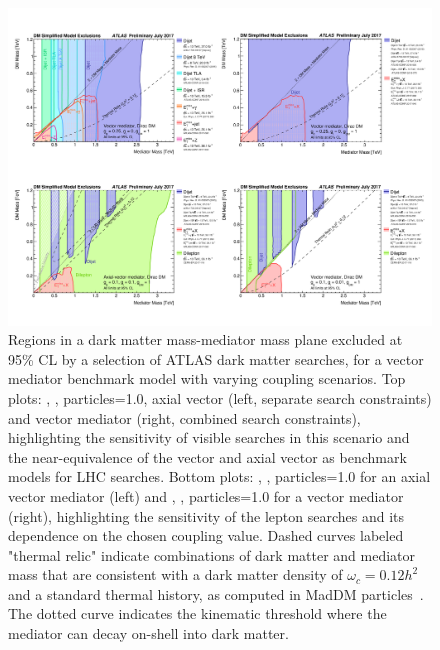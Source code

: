 \begin{figure}[!htpb]
\includegraphics[width=\textwidth]{figures/SummaryPlotsMassMass.pdf}\caption{
Regions in a dark matter mass-mediator mass plane excluded at 95\% CL by a selection of ATLAS dark matter searches, for a vector mediator benchmark model with varying coupling scenarios. Top plots: , , \ginvisible particles=1.0, axial vector (left, separate search constraints) and vector mediator (right, combined search constraints), highlighting the sensitivity of visible searches in this scenario and the near-equivalence of the vector and axial vector as benchmark models for LHC searches. Bottom plots: , , \ginvisible particles=1.0 for an axial vector mediator (left) and , , \ginvisible particles=1.0 for a vector mediator (right), highlighting the sensitivity of the lepton searches and its dependence on the chosen coupling value. Dashed curves labeled "thermal relic" indicate combinations of dark matter and mediator mass that are consistent with a dark matter density of $\omega_c = 0.12 h^2$ and a standard thermal history, as computed in MadDM particles~\cite{Backovic:2015cra}. The dotted curve indicates the kinematic threshold where the mediator can decay on-shell into dark matter. }
\label{fig:sensitivityComparison}
\end{figure}


